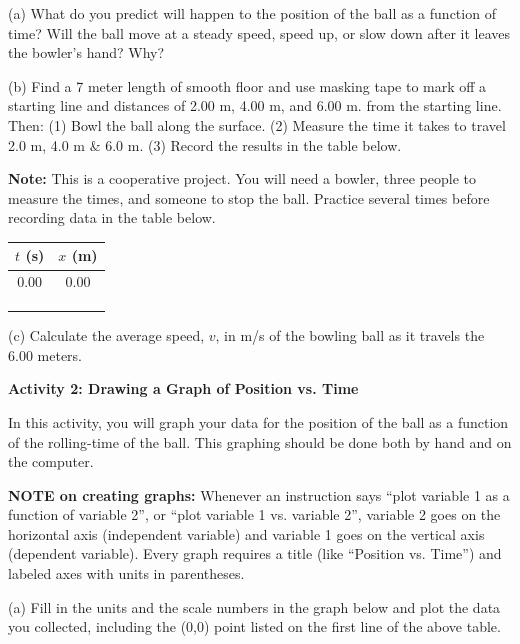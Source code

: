 (a) What do you predict will happen to the position of the ball as a function
of time? Will the ball move at a steady speed, speed up, or slow down after
it leaves the bowler's hand? Why?
\vspace{20mm}

(b) Find a 7 meter length of smooth floor and use masking tape to mark off a
starting line and distances of 2.00 m, 4.00 m, and 6.00 m. from the starting
line. Then: (1) Bowl the ball along the surface. (2) Measure the time it takes
to travel 2.0 m, 4.0 m \& 6.0 m. (3) Record the results in the table below.

\textbf{Note:} This is a cooperative project. You will need a bowler, three
people to measure the times, and someone to stop the ball. Practice several
times before recording data in the table below.

\vspace{0.2cm}
{\centering \begin{tabular}{|c|c|}
\hline 
$t$ (s)&
$x$ (m)\\
\hline 
\hline 
0.00&
0.00\\
\hline 
&
\\
\hline 
&
\\
\hline 
&
\\
\hline 
\end{tabular}\par}
\vspace{0.2cm}

(c) Calculate the average speed, $v$, in m/s of the bowling ball as it travels
the 6.00 meters.
\answerspace{20mm}

\pagebreak[2]
\textbf{Activity 2: Drawing a Graph of Position vs. Time}

In this activity, you will graph your data for the position of the ball as
a function of the rolling-time of the ball. This graphing should be done both
by hand and on the computer.

\textbf{NOTE on creating graphs:} Whenever an instruction says ``plot variable 1 as a function of variable 2'', or ``plot variable 1 vs. variable 2'', variable 2 goes on the horizontal axis (independent variable) and variable 1 goes on the vertical axis (dependent variable). Every graph requires a title (like ``Position vs. Time'') and labeled axes with units in parentheses.

(a) Fill in the units and the scale numbers in the graph below and plot the
data you collected, including the (0,0) point listed on the first line of the
above table.

